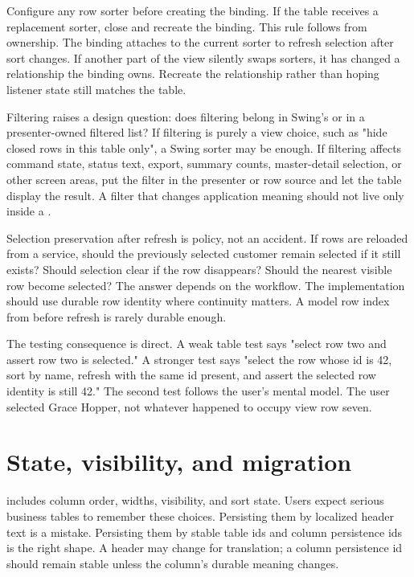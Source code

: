 Configure any row sorter before creating the binding. If the table receives a
replacement sorter, close and recreate the binding. This rule follows from
ownership. The binding attaches to the current sorter to refresh selection
after sort changes. If another part of the view silently swaps sorters, it has
changed a relationship the binding owns. Recreate the relationship rather than
hoping listener state still matches the table.

Filtering raises a design question: does filtering belong in Swing's
 or in a presenter-owned filtered list? If filtering is purely a
view choice, such as "hide closed rows in this table only", a Swing sorter may
be enough. If filtering affects command state, status text, export, summary
counts, master-detail selection, or other screen areas, put the filter in the
presenter or row source and let the table display the result. A filter that
changes application meaning should not live only inside a .

Selection preservation after refresh is policy, not an accident. If rows are
reloaded from a service, should the previously selected customer remain
selected if it still exists? Should selection clear if the row disappears?
Should the nearest visible row become selected? The answer depends on the
workflow. The implementation should use durable row identity where continuity
matters. A model row index from before refresh is rarely durable enough.

The testing consequence is direct. A weak table test says "select row two and
assert row two is selected." A stronger test says "select the row whose id is
42, sort by name, refresh with the same id present, and assert the selected row
identity is still 42." The second test follows the user's mental model. The
user selected Grace Hopper, not whatever happened to occupy view row seven.

\section{State, visibility, and migration}

 includes column order, widths, visibility,
and sort state. Users expect serious business tables to remember these
choices. Persisting them by localized header text is a mistake. Persisting
them by stable table ids and column persistence ids is the right shape. A
header may change for translation; a column persistence id should remain
stable unless the column's durable meaning changes.

